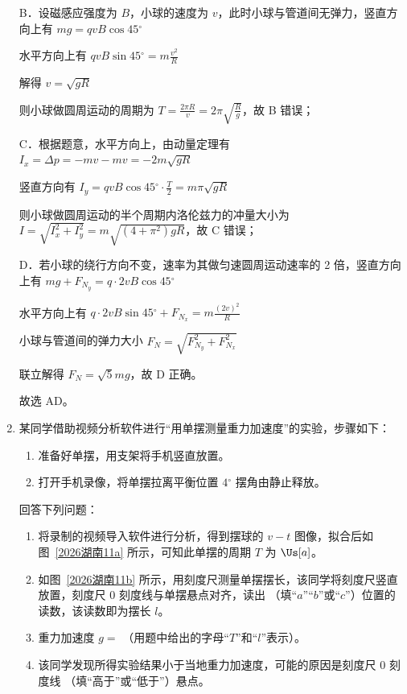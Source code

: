 \documentclass[\gkver]{gaokaozhenti}
\begin{document}
\begin{enumerate}
{B．设磁感应强度为 $B$，小球的速度为 $v$，此时小球与管道间无弹力，竖直方向上有 $mg = qvB \cos 45{^\circ}$

水平方向上有 $qvB \sin 45{^\circ} = m \frac{v^{2}}{R}$

解得 $v = \sqrt{gR}$

则小球做圆周运动的周期为 $T = \frac{2\pi R}{v} = 2\pi\sqrt{\frac{R}{g}}$，故 B 错误；

C．根据题意，水平方向上，由动量定理有 $I_x = \Delta p = -mv - mv = -2m\sqrt{gR}$

竖直方向有 $I_y = qvB \cos 45{^\circ} \cdot \frac{T}{2} = m\pi\sqrt{gR}$

则小球做圆周运动的半个周期内洛伦兹力的冲量大小为 $I = \sqrt{I_x^2 + I_y^2} = m\sqrt{(4 + \pi^2)gR}$，故 C 错误；

D．若小球的绕行方向不变，速率为其做匀速圆周运动速率的 2 倍，竖直方向上有 $mg + F_{N_y} = q \cdot 2vB \cos 45{^\circ}$

水平方向上有 $q \cdot 2vB \sin 45{^\circ} + F_{N_x} = m \frac{(2v)^2}{R}$

小球与管道间的弹力大小 $F_N = \sqrt{F_{N_y}^2 + F_{N_x}^2}$

联立解得 $F_N = \sqrt{5}mg$，故 D 正确。

故选 AD。
}
\item
某同学借助视频分析软件进行“用单摆测量重力加速度”的实验，步骤如下：
\begin{enumerate}[label=\roman*.]
	\item
	准备好单摆，用支架将手机竖直放置。
	\item
	打开手机录像，将单摆拉离平衡位置 $4{^\circ}$ 摆角由静止释放。
\end{enumerate}
回答下列问题：
\twopicture[numA=1, numB=2, showlabel=false, labelA=2026湖南11a, labelB=2026湖南11b, wA=6.50cm, wB=4.00cm]
{}{}
\begin{enumerate}
	\item
	将录制的视频导入软件进行分析，得到摆球的 $v-t$ 图像，拟合后如图~\ref{2026湖南11a} 所示，可知此单摆的周期 $T$ 为 \tkanswer{$0.6\pi$} $\Us[a]$。
	\item
	如图~\ref{2026湖南11b} 所示，用刻度尺测量单摆摆长，该同学将刻度尺竖直放置，刻度尺 0 刻度线与单摆悬点对齐，读出 （填“$a$”“$b$”或“$c$”）位置的读数，该读数即为摆长 $l$。
	\item
	重力加速度 $g =$ （用题中给出的字母“$T$”和“$l$”表示）。
	\item
	该同学发现所得实验结果小于当地重力加速度，可能的原因是刻度尺 0 刻度线 （填“高于”或“低于”）悬点。
\end{enumerate}


\end{enumerate}
\end{document}
